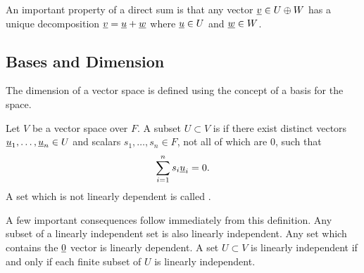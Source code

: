 An important property of a direct sum is that any vector $\underline{v} \in U \oplus W$ has a unique decomposition $\underline{v} = \underline{u} + \underline{w}$ where $\underline{u} \in U$ and $\underline{w} \in W$.
 
\subsection{Bases and Dimension}
\label{section:BasesAndDimension}

The dimension of a vector space is defined using the concept of a basis for the space.

\begin{definition}
Let $V$ be a vector space over $F$.
A subset $U \subset V$ is  if there exist distinct vectors $\underline{u}_1, \ldots, \underline{u}_n \in U$ and scalars $s_1, \ldots, s_n \in F$, not all of which are $0$, such that
\begin{equation*}
\sum_{i=1}^n s_i \underline{u}_i = 0.
\end{equation*}
A set which is not linearly dependent is called .
\end{definition}

A few important consequences follow immediately from this definition.
Any subset of a linearly independent set is also linearly independent.
Any set which contains the $\underline{0}$ vector is linearly dependent.
A set $U \subset V$ is linearly independent if and only if each finite subset of $U$ is linearly independent.

\iffalse

